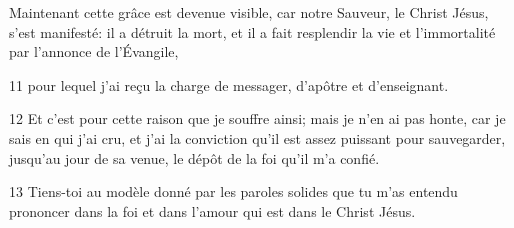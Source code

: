 
Maintenant cette grâce est devenue visible, car notre Sauveur, le Christ Jésus, s’est manifesté: il a détruit la mort, et il a fait resplendir la vie et l’immortalité par l’annonce de l’Évangile,

11 pour lequel j’ai reçu la charge de messager, d’apôtre et d’enseignant.

12 Et c’est pour cette raison que je souffre ainsi; mais je n’en ai pas honte, car je sais en qui j’ai cru, et j’ai la conviction qu’il est assez puissant pour sauvegarder, jusqu’au jour de sa venue, le dépôt de la foi qu’il m’a confié.

13 Tiens-toi au modèle donné par les paroles solides que tu m’as entendu prononcer dans la foi et dans l’amour qui est dans le Christ Jésus.
